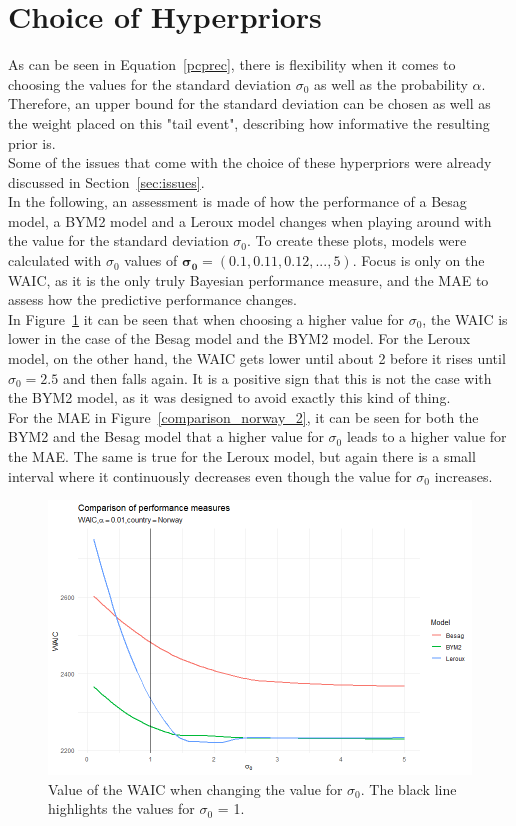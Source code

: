 \section{Choice of Hyperpriors}
As can be seen in Equation~\ref{pcprec}, there is flexibility when it comes to choosing the values for the standard deviation $\sigma_0$ as well as the probability $\alpha$. Therefore, an upper bound for the standard deviation can be chosen as well as the weight placed on this "tail event", describing how informative the resulting prior is. \\
Some of the issues that come with the choice of these hyperpriors were already discussed in Section~\ref{sec:issues}. \\
In the following, an assessment is made of how the performance of a Besag model, a BYM2 model and a Leroux model changes when playing around with the value for the standard deviation $\sigma_0$. To create these plots, models were calculated with $\sigma_0$ values of $\pmb{\sigma_0}=\left(0.1,0.11,0.12,...,5\right)$. Focus is only on the WAIC, as it is the only truly Bayesian performance measure, and the MAE to assess how the predictive performance changes.\\
In Figure~\ref{comparison_norway_1} it can be seen that when choosing a higher value for $\sigma_0$, the WAIC is lower in the case of the Besag model and the BYM2 model. For the Leroux model, on the other hand, the WAIC gets lower until about 2 before it rises until $\sigma_0 = 2.5$ and then falls again. It is a positive sign that this is not the case with the BYM2 model, as it was designed to avoid exactly this kind of thing. \\
For the MAE in Figure~\ref{comparison_norway_2}, it can be seen for both the BYM2 and the Besag model that a higher value for $\sigma_0$ leads to a higher value for the MAE. The same is true for the Leroux model, but again there is a small interval where it continuously decreases even though the value for $\sigma_0$ increases.
\begin{figure}[H]
    \centering
    \includegraphics[width = \textwidth]{waic_norway_smooth.png}
    \caption{Value of the WAIC when changing the value for $\sigma_0$. The black line highlights the values for $\sigma_0$ = 1.}
    \label{comparison_norway_1}
\end{figure}
